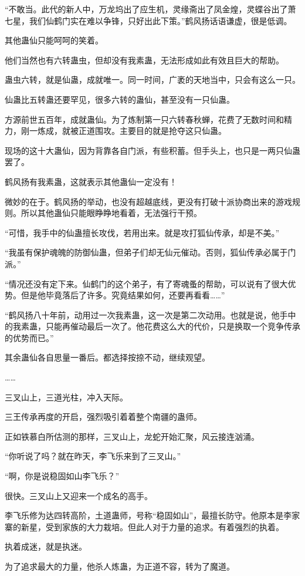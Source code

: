 \begin{this_body}
“不敢当。此代的新人中，万龙坞出了应生机，灵缘斋出了凤金煌，灵蝶谷出了萧七星，我们仙鹤门实在难以争锋，只好出此下策。”鹤风扬话语谦虚，很是低调。

其他蛊仙只能呵呵的笑着。

他们当然也有六转蛊虫，但却没有我素蛊，无法形成如此有效且巨大的帮助。

蛊虫六转，就是仙蛊，成就唯一。同一时间，广袤的天地当中，只会有这么一只。

仙蛊比五转蛊还要罕见，很多六转的蛊仙，甚至没有一只仙蛊。

方源前世五百年，成就蛊仙。为了炼制第一只六转春秋蝉，花费了无数时间和精力，刚一炼成，就被正道围攻。主要目的就是抢夺这只仙蛊。

现场的这十大蛊仙，因为背靠各自门派，有些积蓄。但手头上，也只是一两只仙蛊罢了。

鹤风扬有我素蛊，这就表示其他蛊仙一定没有！

微妙的在于。鹤风扬的举动，也没有超越底线，更没有打破十派协商出来的游戏规则。所以其他蛊仙只能眼睁睁地看着，无法强行干预。

“可惜，我手中的仙蛊擅长攻伐，若用出来。就是攻打狐仙传承，却是不美。”

“我虽有保护魂魄的防御仙蛊，但弟子们却无仙元催动。否则，狐仙传承必属于门派。”

“情况还没有定下来。仙鹤门的这个弟子，有了寄魂蚤的帮助，可以说有了很大优势。但是他毕竟落后了许多。究竟结果如何，还要再看看……”

“鹤风扬八十年前，动用过一次我素蛊，这一次是第二次动用。也就是说，他手中的我素蛊，只能再催动最后一次了。他花费这么大的代价，只是换取一个竞争传承的优势而已。”

其余蛊仙各自思量一番后。都选择按捺不动，继续观望。

……

三叉山上，三道光柱，冲入天际。

三王传承再度的开启，强烈吸引着着整个南疆的蛊师。

正如铁慕白所估测的那样，三叉山上，龙蛇开始汇聚，风云接连汹涌。

“你听说了吗？就在昨天，李飞乐来到了三叉山。”

“啊，你是说稳固如山李飞乐？”

很快。三叉山上又迎来一个成名的高手。

李飞乐修为达四转高阶，土道蛊师，号称“稳固如山”，最擅长防守。他原本是李家寨的新星，受到家族的大力栽培。但此人对于力量的追求。有着强烈的执着。

执着成迷，就是执迷。

为了追求最大的力量，他杀人炼蛊，为正道不容，转为了魔道。


\end{this_body}
